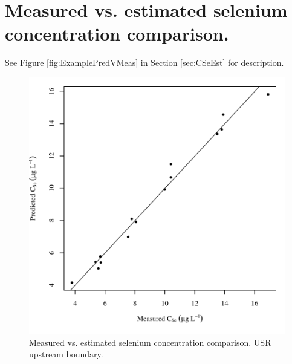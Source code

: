 \section{Measured vs. estimated selenium concentration comparison.}
\label{App:AppPredVMeas}

See Figure \ref{fig:ExamplePredVMeas} in Section \ref{sec:CSeEst} for description.

\begin{figure}[htbp]
	\begin{center}
	\includegraphics[width=6in]{"Figures/Results_USR/Conc Model pred v meas U163"}
	\caption{Measured vs. estimated selenium concentration comparison.  USR upstream boundary.}
	\end{center}
\end{figure}
\newpage

